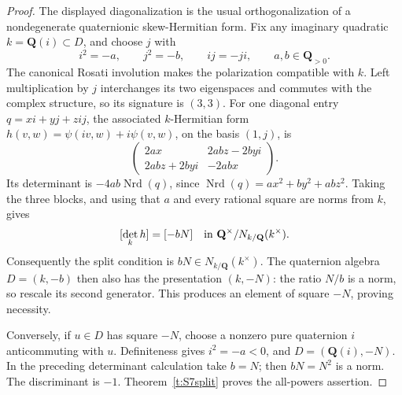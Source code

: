 \documentclass[10pt,reqno]{article}
\theoremstyle{emphasizedplain}
\theoremstyle{emphasizeddefinition}
\theoremstyle{emphasizeddefinition}
\newcommand{\Q}{\mathbf Q}
\begin{document}
\begin{proof}
The displayed diagonalization is the usual orthogonalization of a
nondegenerate quaternionic skew-Hermitian form. Fix any imaginary
quadratic $k=\Q(i)\subset D$, and choose $j$ with
\[
 i^2=-a,\qquad j^2=-b,\qquad ij=-ji,\qquad a,b\in\Q_{>0}.
\]
The canonical Rosati involution makes the polarization compatible with
$k$. Left multiplication by $j$ interchanges its two eigenspaces and
commutes with the complex structure, so its signature is $(3,3)$.
For one diagonal entry $q=xi+yj+zij$, the associated $k$-Hermitian
form $h(v,w)=\psi(iv,w)+i\psi(v,w)$, on the basis $(1,j)$, is
\[
 \begin{pmatrix}
 2ax&2abz-2byi\\
 2abz+2byi&-2abx
 \end{pmatrix}.
\]
Its determinant is $-4ab\operatorname{Nrd}(q)$, since
$\operatorname{Nrd}(q)=ax^2+by^2+abz^2$.
Taking the three blocks, and using that $a$ and every rational square
are norms from $k$, gives
\[
 [\det_k h]=[-bN]\quad\hbox{in }\Q^\times/N_{k/\Q}(k^\times).
\]
Consequently the split condition is $bN\in N_{k/\Q}(k^\times)$.
The quaternion algebra $D=(k,-b)$ then also has the presentation
$(k,-N)$: the ratio $N/b$ is a norm, so rescale its second generator.
This produces an element of square $-N$, proving necessity.

Conversely, if $u\in D$ has square $-N$, choose a nonzero pure
quaternion $i$ anticommuting with $u$. Definiteness gives $i^2=-a<0$,
and $D=(\Q(i),-N)$. In the preceding determinant calculation take
$b=N$; then $bN=N^2$ is a norm. The discriminant is $-1$.
Theorem~\ref{t:S7split} proves the all-powers assertion.
\end{proof}
\end{document}
